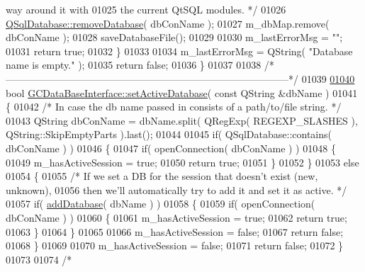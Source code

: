 \begin{DoxyCode}
{{{{{{{{{{{{{{{{{{{{{{{{{{{{{{{{{{{{{{       way around it with}
01025 \textcolor{comment}{      the current QtSQL modules. */}
01026     \hyperlink{class_g_c_data_base_interface_a86dcb92e64a35e3fb72fa58a4bacc3b9}{QSqlDatabase::removeDatabase}( dbConName );
01027     m\_dbMap.remove( dbConName );
01028     saveDatabaseFile();
01029 
01030     m\_lastErrorMsg = \textcolor{stringliteral}{""};
01031     \textcolor{keywordflow}{return} \textcolor{keyword}{true};
01032   \}
01033 
01034   m\_lastErrorMsg = QString( \textcolor{stringliteral}{"Database name is empty."} );
01035   \textcolor{keywordflow}{return} \textcolor{keyword}{false};
01036 \}
01037 
01038 \textcolor{comment}{/*
      --------------------------------------------------------------------------------------*/}
01039 
\hypertarget{gcdatabaseinterface_8cpp_source_l01040}{}\hyperlink{class_g_c_data_base_interface_a176952c9ba2fbc90809f9d64ea14a69f}{01040} \textcolor{keywordtype}{bool} \hyperlink{class_g_c_data_base_interface_a176952c9ba2fbc90809f9d64ea14a69f}{GCDataBaseInterface::setActiveDatabase}( \textcolor{keyword}{const} QString &dbName )
01041 \{
01042   \textcolor{comment}{/* In case the db name passed in consists of a path/to/file string. */}
01043   QString dbConName = dbName.split( QRegExp( REGEXP\_SLASHES ), 
      QString::SkipEmptyParts ).last();
01044 
01045   \textcolor{keywordflow}{if}( QSqlDatabase::contains( dbConName ) )
01046   \{
01047     \textcolor{keywordflow}{if}( openConnection( dbConName ) )
01048     \{
01049       m\_hasActiveSession = \textcolor{keyword}{true};
01050       \textcolor{keywordflow}{return} \textcolor{keyword}{true};
01051     \}
01052   \}
01053   \textcolor{keywordflow}{else}
01054   \{
01055     \textcolor{comment}{/* If we set a DB for the session that doesn't exist (new, unknown),}
01056 \textcolor{comment}{      then we'll automatically try to add it and set it as active. */}
01057     \textcolor{keywordflow}{if}( \hyperlink{class_g_c_data_base_interface_a6b3cc67ba9e4bdf58b49869243446764}{addDatabase}( dbName ) )
01058     \{
01059       \textcolor{keywordflow}{if}( openConnection( dbConName ) )
01060       \{
01061         m\_hasActiveSession = \textcolor{keyword}{true};
01062         \textcolor{keywordflow}{return} \textcolor{keyword}{true};
01063       \}
01064     \}
01065 
01066     m\_hasActiveSession = \textcolor{keyword}{false};
01067     \textcolor{keywordflow}{return} \textcolor{keyword}{false};
01068   \}
01069 
01070   m\_hasActiveSession = \textcolor{keyword}{false};
01071   \textcolor{keywordflow}{return} \textcolor{keyword}{false};
01072 \}
01073 
01074 \textcolor{comment}{/*
}}}}}}}}}}}}}}}}}}}}}}}}}}}}}}}}}}}}}}
\end{DoxyCode}
